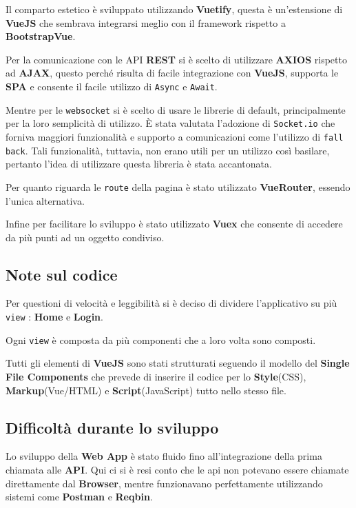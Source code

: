         Il comparto estetico è sviluppato utilizzando \textbf{Vuetify}, questa è un'estensione di \textbf{VueJS} che sembrava integrarsi meglio con il framework rispetto a \textbf{BootstrapVue}.
        
        Per la comunicazione con le API \textbf{REST} si è scelto di utilizzare \textbf{AXIOS} rispetto ad \textbf{AJAX}, questo perché risulta di facile integrazione con \textbf{VueJS}, supporta le \textbf{SPA} e consente il facile utilizzo di \texttt{Async} e \texttt{Await}.
        
        Mentre per le \texttt{websocket} si è scelto di usare le librerie di default, principalmente per la loro semplicità di utilizzo. È stata valutata l'adozione di \texttt{Socket.io} che forniva maggiori funzionalità  e supporto a comunicazioni come l'utilizzo di \texttt{fall back}.
        Tali funzionalità, tuttavia, non erano utili per un utilizzo così basilare, pertanto l'idea di utilizzare questa libreria è stata accantonata.
        
        Per quanto riguarda le \texttt{route} della pagina è stato utilizzato \textbf{VueRouter}, essendo l'unica alternativa.
        
        Infine per facilitare lo sviluppo è stato utilizzato \textbf{Vuex} che consente di accedere da più punti ad un oggetto condiviso.
        
    \subsection{Note sul codice}
        Per questioni di velocità e leggibilità si è deciso di dividere l'applicativo su più \texttt{view} : \textbf{Home} e \textbf{Login}.
        
        Ogni \texttt{view} è composta da più componenti che a loro volta sono composti.
        
        Tutti gli elementi di \textbf{VueJS} sono stati strutturati seguendo il modello del \textbf{Single File Components} che prevede di inserire il codice per lo \textbf{Style}(CSS), \textbf{Markup}(Vue/HTML) e \textbf{Script}(JavaScript) tutto nello stesso file.
        
    \subsection{Difficoltà durante lo sviluppo}
    
        Lo sviluppo della \textbf{Web App}  è stato fluido fino all'integrazione della prima chiamata alle \textbf{API}. Qui ci si è resi conto che le api non potevano essere chiamate direttamente dal \textbf{Browser}, mentre funzionavano perfettamente utilizzando sistemi come \textbf{Postman} e \textbf{Reqbin}. 
        
